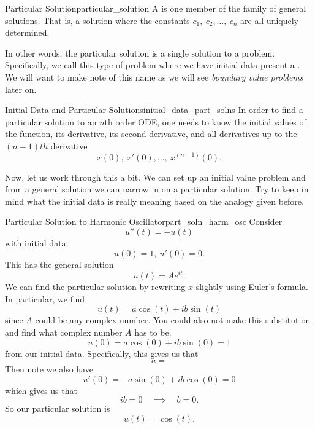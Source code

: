         \begin{df}{Particular Solution}{particular_solution}
            A  is one member of the family of general solutions.  That is, a solution where the constants $c_1,~c_2,\dots,~c_n$ are all uniquely determined.
        \end{df}
        
        \noindent In other words, the particular solution is a single solution to a problem.  Specifically, we call this type of problem where we have initial data present a  .  We will want to make note of this name as we will see \emph{boundary value problems} later on. 
        
        \begin{prop}{Initial Data and Particular Solutions}{initial_data_part_solns}
        In order to find a particular solution to an $n$th order ODE, one needs to know the initial values of the function, its derivative, its second derivative, and all derivatives up to the $(n-1)th$ derivative
        \[
        x(0),~ x'(0),\dots,~ x^{(n-1)}(0).
        \]
        \end{prop}
        
        \noindent Now, let us work through this a bit.  We can set up an initial value problem and from a general solution we can narrow in on a particular solution.  Try to keep in mind what the initial data is really meaning based on the analogy given before.
        
        
        \begin{ex}{Particular Solution to Harmonic Oscillator}{part_soln_harm_osc}
        Consider 
        \[
        u''(t)=-u(t)
        \]
        with initial data
        \[
        u(0)=1, ~ u'(0)=0.
        \]
        This has the general solution
        \[
        u(t)=Ae^{it}.
        \]
        We can find the particular solution by rewriting $x$ slightly using Euler's formula. In particular, we find
        \[
        u(t)=a\cos(t)+ib\sin(t)
        \]
        since $A$ could be any complex number.  You could also not make this substitution and find what complex number $A$ has to be.
        \[
        u(0)=a\cos(0)+ib\sin(0)=1
        \]
        from our initial data.  Specifically, this gives us that
        \[
        a=
        \]
        Then note we also have
        \[
        u'(0)=-a\sin (0) +i b\cos (0)=0
        \]
        which gives us that
        \[
        ib=0 \quad \implies \quad b=0.
        \]
        So our particular solution is
        \[
        u(t)=\cos (t).
        \]
        \end{ex}
        
